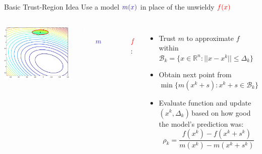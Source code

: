 \documentclass[handout,aspectratio=54]{beamer}
\numberwithin{theorem}{section}
\begin{document}
\begin{frame}{Basic Trust-Region Idea}
Use a model $\textcolor{blue}{m(x)}$ in place of the unwieldy $\textcolor{red}{f(x)}$

\begin{columns}
\includegraphics[width=\textwidth]{fig/22-2.jpg}

\colorbox[rgb]{0.5,0.6,0.7}{\textcolor{white}{Optimize over }$\textcolor{blue}{m}$ \textcolor{white}{to avoidexpense }}

\colorbox[rgb]{0.5,0.6,0.7}{\textcolor{white}{of} $\textcolor{red}{f}$:}

\begin{itemize}
\item Trust $m$ to approximate $f$ within $ \mathcal{B}_k=\{x\in\mathbb{R}^n:||x-x^k||\le \Delta_k\}$
\item Obtain next point from $\min\{m(x^k+s):x^k+s\in \mathcal{B}_k\}$
\item Evaluate function and update $(x^k, \Delta_k)$\,based on how good the model's prediction was:
\begin{equation*}
\rho_k=\frac{f(x^k)-f(x^k+s^k)}{m(x^k)-m(x^k+s^k)}
\end{equation*}
\end{itemize}

\footnotesize{}
\end{columns}
\end{frame}
\end{document}
